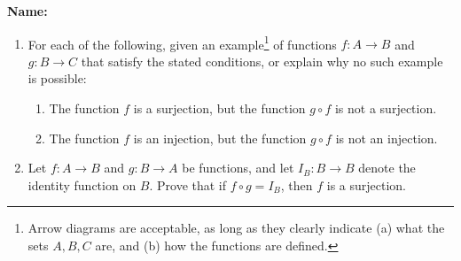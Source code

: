 \documentclass[12pt]{article}
\newcommand{\points}[1]{\marginpar{\hspace{24pt}[#1]}}
\begin{document}
{\bf Name:}
\thispagestyle{fancy}

\bigskip


\begin{enumerate}
 \item For each of the following, given an example\footnote{Arrow diagrams are acceptable, as long as they clearly indicate (a) what the sets $A,B,C$ are, and (b) how the functions are defined.} of functions $f:A\to B$ and $g:B\to C$ that satisfy the stated conditions, or explain why no such example is possible:
\begin{enumerate}
 \item The function $f$ is a surjection, but the function $g\circ f$ is not a surjection. \points{3}

 \vspace{2in}

 \item The function $f$ is an injection, but the function $g\circ f$ is not an injection. \points{3}

 \vspace{2in}

 \end{enumerate}
\item Let $f:A\to B$ and $g:B\to A$ be functions, and let $I_B:B\to B$ denote the identity function on $B$. Prove that if $f\circ g=I_B$, then $f$ is a surjection.\points{4}

\end{enumerate}
\end{document}
